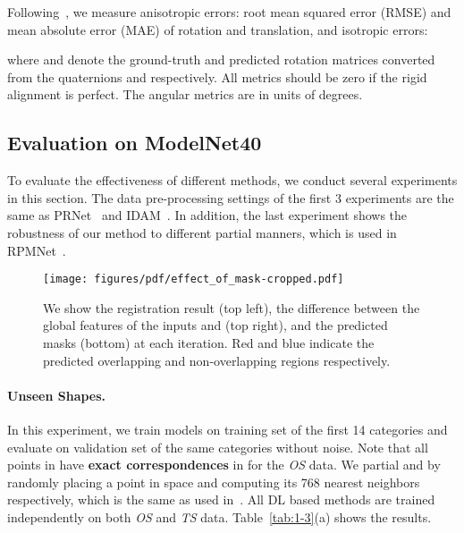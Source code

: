 \documentclass[10pt,twocolumn,letterpaper]{article}
\begin{document}
Following~\cite{wang2019deep, yew2020-RPMNet}, we measure anisotropic errors: root mean squared error (RMSE) and mean absolute error (MAE) of rotation and translation, and isotropic errors:

where  and  denote the ground-truth and predicted rotation matrices converted from the quaternions  and  respectively. All  metrics should be zero if the rigid alignment is perfect. The angular metrics are in units of degrees.

\subsection{Evaluation on ModelNet40} \label{sec:4.3}
To evaluate the effectiveness of different methods, we conduct several experiments in this section. The data pre-processing settings of the first 3 experiments are the same as PRNet~\cite{wang2019prnet} and IDAM~\cite{idam}. In addition, the last experiment shows the robustness of our method to different partial manners, which is used in RPMNet~\cite{yew2020-RPMNet}.
\begin{figure*}[t]
    \centering
    \texttt{[image: figures/pdf/effect\_of\_mask-cropped.pdf]}\\
    \caption{We show the registration result (top left), the difference between the global features of the inputs  and  (top right), and the predicted masks (bottom) at each iteration. Red and blue indicate the predicted overlapping and non-overlapping regions respectively.}
    \vspace{-0.35cm}
    \label{fig:effect of mask}
\end{figure*} \vspace{-0.50cm}
\paragraph{Unseen Shapes.}
In this experiment, we train models on training set of the first 14 categories and evaluate on validation set of the same categories without noise. Note that all points in  have \textbf{exact correspondences} in  for the \emph{OS} data. We partial  and  by randomly placing a point in space and computing its 768 nearest neighbors respectively, which is the same as used in~\cite{wang2019prnet, idam}.  All DL based methods are trained independently on both \emph{OS} and \emph{TS} data. Table~\ref{tab:1-3}(a) shows the results. 
\end{document}
